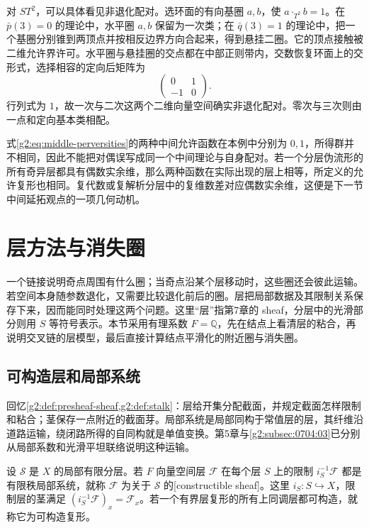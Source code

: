 \ProseParagraphBreak

对 \(ST^2\)，可以具体看见非退化配对。选环面的有向基圈 \(a,b\)，使 \(a\cdot_{T^2}b=1\)。在 \(\bar p(3)=0\) 的理论中，水平圈 \(a,b\) 保留为一次类；在 \(\bar q(3)=1\) 的理论中，把一个基圈分别锥到两顶点并按相反边界方向合起来，得到悬挂二圈。它的顶点接触被二维允许界许可。水平圈与悬挂圈的交点都在中部正则带内，交数恢复环面上的交形式，选择相容的定向后矩阵为
\[
	\begin{pmatrix}0&1\\-1&0\end{pmatrix}.
\]
行列式为 \(1\)，故一次与二次这两个二维向量空间确实非退化配对。零次与三次则由一点和定向基本类相配。

\ProseParagraphBreak

式\eqref{g2:eq:middle-perversities}的两种中间允许函数在本例中分别为 \(0,1\)，所得群并不相同，因此不能把对偶误写成同一个中间理论与自身配对。若一个分层伪流形的所有奇异层都具有偶数实余维，那么两种函数在实际出现的层上相等，所定义的允许复形也相同。复代数或复解析分层中的复维数差对应偶数实余维，这便是下一节中间延拓观点的一项几何动机。

\section{层方法与消失圈}
\label{g2:sec:B04}

一个链接说明奇点周围有什么圈；当奇点沿某个层移动时，这些圈还会彼此运输。若空间本身随参数退化，又需要比较退化前后的圈。层把局部数据及其限制关系保存下来，因而能同时处理这两个问题。这里“层”指第7章的 sheaf，分层中的光滑部分则用 \(S\) 等符号表示。本节采用有理系数 \(F=\mathbb Q\)，先在结点上看清层的粘合，再说明交叉链的层模型，最后直接计算结点平滑化的附近圈与消失圈。

\subsection{可构造层和局部系统}
\label{g2:subsec:B04:01}

回忆\cref{g2:def:presheaf-sheaf,g2:def:stalk}：层给开集分配截面，并规定截面怎样限制和粘合；茎保存一点附近的截面芽。局部系统是局部同构于常值层的层，其纤维沿道路运输，绕闭路所得的自同构就是单值变换。第5章与\cref{g2:subsec:0704:03}已分别从局部系数和光滑平坦联络说明这种运输。

\begin{definition}\label{g2:def:constructible-sheaf}
	设 \(\mathcal S\) 是 \(X\) 的局部有限分层。若 \(F\) 向量空间层 \(\mathcal F\) 在每个层 \(S\) 上的限制 \(i_S^{-1}\mathcal F\) 都是有限秩局部系统，就称 \(\mathcal F\) 为关于 \(\mathcal S\) 的[constructible sheaf]。这里 \(i_S:S\hookrightarrow X\)，限制层的茎满足 \((i_S^{-1}\mathcal F)_x=\mathcal F_x\)。若一个有界层复形的所有上同调层都可构造，就称它为可构造复形。
\end{definition}

